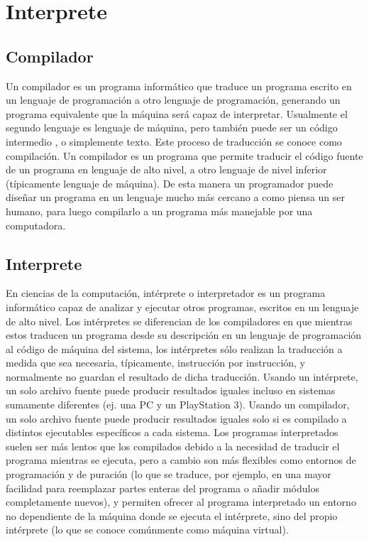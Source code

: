 \section{Interprete}

\subsection{Compilador}
Un compilador es un programa informático que traduce un programa escrito en un lenguaje de programación a otro lenguaje de programación, generando un programa equivalente que la máquina será capaz de interpretar. Usualmente el segundo lenguaje es lenguaje de máquina, pero también puede ser un código intermedio , o simplemente texto. Este proceso de traducción se conoce como compilación.
Un compilador es un programa que permite traducir el código fuente de un programa en lenguaje de alto nivel, a otro lenguaje de nivel inferior (típicamente lenguaje de máquina). De esta manera un programador puede diseñar un programa en un lenguaje mucho más cercano a como piensa un ser humano, para luego compilarlo a un programa más manejable por una computadora.

\subsection{Interprete}
En ciencias de la computación, intérprete o interpretador es un programa informático capaz de analizar y ejecutar otros programas, escritos en un lenguaje de alto nivel. Los intérpretes se diferencian de los compiladores en que mientras estos traducen un programa desde su descripción en un lenguaje de programación al código de máquina del sistema, los intérpretes sólo realizan la traducción a medida que sea necesaria, típicamente, instrucción por instrucción, y normalmente no guardan el resultado de dicha traducción.
Usando un intérprete, un solo archivo fuente puede producir resultados iguales incluso en sistemas sumamente diferentes (ej. una PC y un PlayStation 3). Usando un compilador, un solo archivo fuente puede producir resultados iguales solo si es compilado a distintos ejecutables específicos a cada sistema.
Los programas interpretados suelen ser más lentos que los compilados debido a la necesidad de traducir el programa mientras se ejecuta, pero a cambio son más flexibles como entornos de programación y de puración (lo que se traduce, por ejemplo, en una mayor facilidad para reemplazar partes enteras del programa o añadir módulos completamente nuevos), y permiten ofrecer al programa interpretado un entorno no dependiente de la máquina donde se ejecuta el intérprete, sino del propio intérprete (lo que se conoce comúnmente como máquina virtual).

